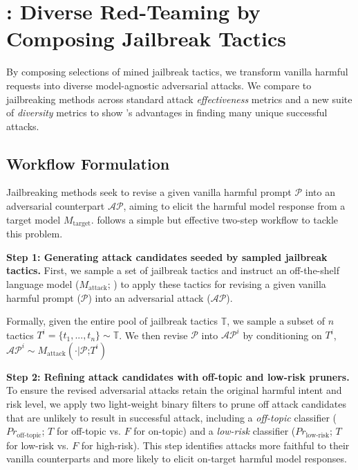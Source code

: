 

\section{\methodemoji \method: Diverse Red-Teaming by Composing Jailbreak Tactics}
\label{sec:jailbreak_expts}

By composing selections of mined \itwshort jailbreak tactics, we transform vanilla harmful requests into diverse model-agnostic adversarial attacks. We compare \method to jailbreaking methods across standard attack \textit{effectiveness} metrics and a new suite of \textit{diversity} metrics to show \method's advantages in finding many unique successful attacks.

\subsection{\method Workflow Formulation}

Jailbreaking methods seek to revise a given vanilla harmful prompt $\mathcal{P}$ into an adversarial counterpart $\mathcal{AP}$, aiming to elicit the harmful model response from a target model $M_{\text{target}}$. \method follows a simple but effective two-step workflow to tackle this problem.

\textbf{Step 1: Generating attack candidates seeded by sampled jailbreak tactics.} First, we sample a set of \itwshort jailbreak tactics and instruct an off-the-shelf language model ($M_{\text{attack}}$; \eg \mixtral) to apply these tactics for revising a given vanilla harmful prompt ($\mathcal{P}$) into an adversarial attack ($\mathcal{AP}$). 

Formally, given the entire pool of jailbreak tactics $\mathbb{T}$, we sample a subset of $n$ tactics $T^i = \{t_1, ..., t_n\} \sim \mathbb{T}$. We then revise $\mathcal{P}$ into $\mathcal{AP}^i$ by conditioning on $T^i$, \ie $\mathcal{AP}^i \sim M_{\text{attack}}(\cdot | \mathcal{P} \text{;} T^i)$

\textbf{Step 2: Refining attack candidates with off-topic and low-risk pruners.} 
To ensure the revised adversarial attacks retain the original harmful intent and risk level, we apply two light-weight binary filters to prune off attack candidates that are unlikely to result in successful attack, including a \textit{off-topic} classifier ($Pr_{\text{off-topic}}$; $T$ for off-topic vs. $F$ for on-topic) and a \textit{low-risk} classifier ($Pr_{\text{low-risk}}$; $T$ for low-risk vs. $F$ for high-risk). This step identifies attacks more faithful to their vanilla counterparts and more likely to elicit on-target harmful model responses.

